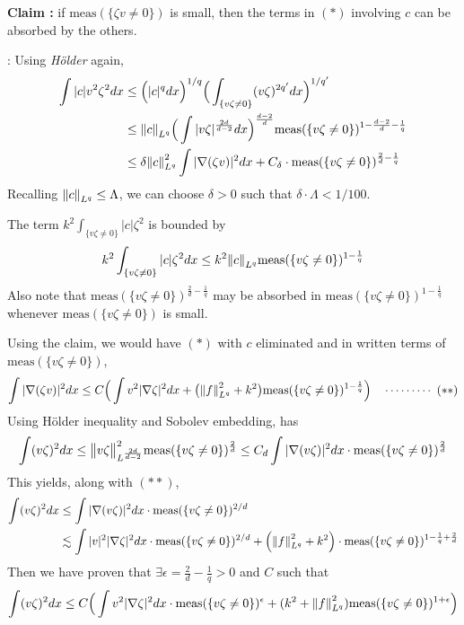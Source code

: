 \documentclass[12pt,a4paper]{article}
\newenvironment{proof}
{\begin{changemargin}{0.5cm}{0.5cm} 
	}%
	{\end{changemargin}
}
\newenvironment{subproof}
{\begin{changemargin}{0.5cm}{0.5cm} 
	}%
	{\end{changemargin}
}
\newenvironment{p}
{\begin{proof} 
	}%
	{\end{proof}
}
\begin{document}
\begin{p}
\textbf{Claim :} if $\text{meas}(\{\zeta v\neq 0\})$ is small, then the terms in $(*)$ involving $c$ can be absorbed by the others. 
\begin{subproof}
: Using \emph{H\"older} again,
\begin{align*}
\int |c| v^2 \zeta^2 dx & \leq \Big( |c|^q dx\Big)^{1/q} \Big( \int_{\{v\zeta \neq 0\}} (v\zeta)^{2q'} dx\Big)^{1/q'} \\
& \leq \snorms{c}{L^q} \Big( \int |v\zeta|^{\frac{2d}{d-2}} dx\Big)^{\frac{d-2}{d}} \text{meas}(\{v\zeta \neq 0\})^{1-\frac{d-2}{d} - \frac{1}{q}} \\
& \leq \delta \snorms{c}{L^q}^2 \int |\nabla(\zeta v)|^2 dx + C_{\delta}\cdot \text{meas}(\{v\zeta \neq 0\})^{\frac{2}{d} - \frac{1}{q}}
\end{align*}
Recalling $\snorms{c}{L^q} \leq \Lambda$, we can choose $\delta >0$ such that $\delta \cdot \Lambda < 1/100$.

\quad The term $k^2 \int_{\{v\zeta \neq 0 \}} |c| \zeta^2$ is bounded by
\begin{align*}
k^2 \int_{\{v\zeta \neq 0 \}} |c| \zeta^2 dx \leq k^2 \snorms{c}{L^q} \text{meas}(\{v\zeta \neq 0\})^{1- \frac{1}{q}}
\end{align*}
Also note that $\text{meas}(\{v\zeta \neq 0 \})^{\frac{2}{d} - \frac{1}{q}}$ may be absorbed in $\text{meas}(\{v\zeta \neq 0 \})^{1-\frac{1}{q}}$ whenever $\text{meas}(\{v\zeta \neq 0 \})$ is small.
\end{subproof}
Using the claim, we would have $(*)$ with $c$ eliminated and in written terms of $\text{meas}(\{v\zeta \neq 0\})$, 
\begin{align*}
\int |\nabla (\zeta v)|^2 dx \leq C \Big( \int v^2 |\nabla \zeta|^2 dx + \big( \snorms{f}{L^q}^2 + k^2 \big) \text{meas}(\{v\zeta \neq 0 \})^{1-\frac{1}{q}}\Big) \call{**} 
\end{align*}
Using H\"older inequality and Sobolev embedding, has
\begin{align*}
\int (v\zeta)^2 dx \leq \bigl\lVert v\zeta\bigr\rVert_{L^{\frac{2d}{d-2}}}^2 \text{meas}(\{v\zeta \neq 0 \})^{\frac{2}{d}} \leq C_d \int |\nabla(v\zeta)|^2 dx \cdot \text{meas}(\{v\zeta \neq 0 \})^{\frac{2}{d}}
\end{align*}
This yields, along with $(**)$,
\begin{align*}
\int (v\zeta)^2 dx &\leq \int |\nabla (v\zeta )|^2 dx \cdot \text{meas}(\{v\zeta \neq 0\})^{2/d} \\
& \lesssim \int |v|^2 |\nabla \zeta|^2 dx \cdot \text{meas}(\{v\zeta \neq 0\})^{2/d} + \Big( \snorms{f}{L^q}^2 +k^2 \Big) \cdot \text{meas}(\{v\zeta \neq 0\})^{1- \frac{1}{q} + \frac{2}{d}}
\end{align*}
Then we have proven that $\exists \epsilon = \frac{2}{d} - \frac{1}{q} >0$ and $C$ such that
\begin{align*}
\int (v\zeta)^2 dx \leq C\Big( \int v^2 |\nabla \zeta|^2 dx \cdot \text{meas}(\{v\zeta \neq 0\})^{\epsilon} + (k^2 + \snorms{f}{L^q}^2) \text{meas}(\{v\zeta \neq 0\})^{1+ \epsilon} \Big)
\end{align*}


\end{p}
\end{document}
